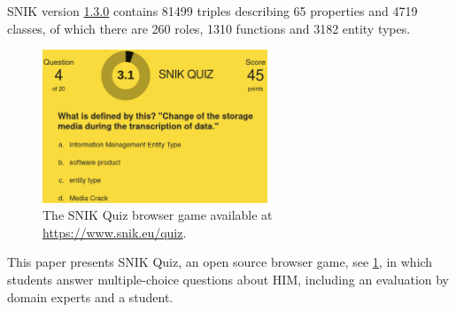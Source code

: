 \documentclass{IOS-Book-Article}     %
\newcommand{\citep}{\cite}%
\newcommand{\snikversion}{1.3.0}
\newcommand{\snikversionlink}{\href{https://github.com/snikproject/ontology/releases/tag/\snikversion}{\snikversion}}
\newcommand{\sniktriples}{\num{81499}}
\newcommand{\snikclasses}{\num{4719}}
\newcommand{\snikroles}{260}
\newcommand{\snikfunctions}{\num{1310}}
\newcommand{\snikentitytypes}{\num{3182}}
\newcommand{\snikproperties}{65}
\begin{document}
SNIK version \snikversionlink{} contains \sniktriples{} triples describing \snikproperties{} properties and \snikclasses{} classes, of which there are \snikroles{} roles, \snikfunctions{} functions and \snikentitytypes{} entity types.
%
\begin{figure}
\caption{The SNIK Quiz browser game available at \url{https://www.snik.eu/quiz}.}
\label{fig:snikquiz}
\centering
\includegraphics[width=0.6\textwidth]{img/snik-quiz.png}
\end{figure}
This paper presents SNIK Quiz, an open source\footnotemark{} browser game, see \cref{fig:snikquiz}, in which students answer multiple-choice questions about HIM, including an evaluation by domain experts and a student.
\end{document}
